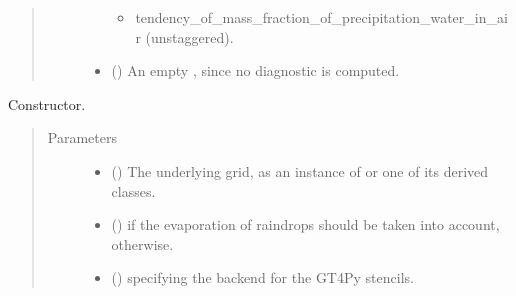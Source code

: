 \documentclass[letterpaper,10pt,english]{sphinxmanual}
\begin{document}
\begin{fulllineitems}
\begin{fulllineitems}
\begin{quote}
\begin{description}
\begin{itemize}
\begin{itemize}
\item {} 
tendency\_of\_mass\_fraction\_of\_precipitation\_water\_in\_air (unstaggered).

\end{itemize}

\item {} 
 () \textendash{} An empty {\hyperref[\detokenize{api:tasmania.storages.grid_data.GridData}]{}}, since no diagnostic is computed.

\end{itemize}


\end{description}\end{quote}

\end{fulllineitems}


\begin{fulllineitems}
\label{\detokenize{api:tasmania.parameterizations.slow_tendency_microphysics_kessler_wrf_saturation.SlowTendencyMicrophysicsKesslerWRFSaturation.__init__}}
Constructor.
\begin{quote}\begin{description}
\item[{Parameters}] \leavevmode\begin{itemize}
\item {} 
 () \textendash{} The underlying grid, as an instance of {\hyperref[\detokenize{api:tasmania.grids.grid_xyz.GridXYZ}]{}} or one of its derived classes.

\item {} 
 () \textendash{}  if the evaporation of raindrops should be taken into account,  otherwise.

\item {} 
 () \textendash{}  specifying the backend for the GT4Py stencils.


\end{itemize}
\end{description}
\end{quote}
\end{fulllineitems}
\end{fulllineitems}
\end{document}
